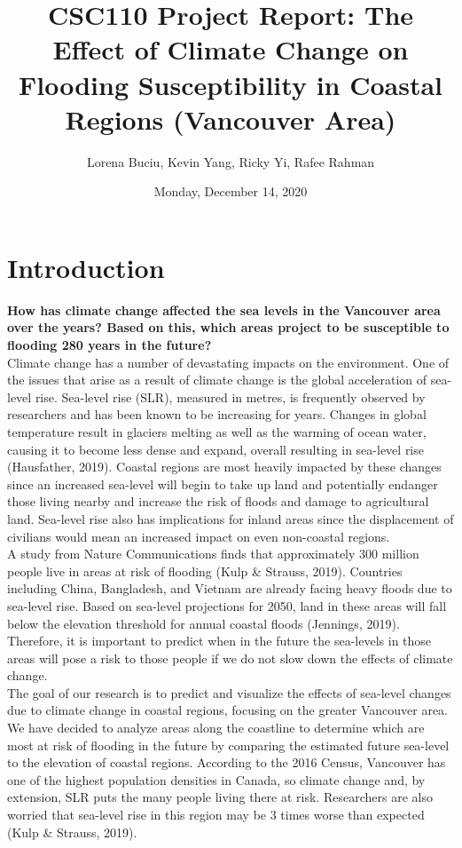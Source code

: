 \documentclass[fontsize=11pt]{article}
\title{CSC110 Project Report: The Effect of Climate Change on Flooding Susceptibility in Coastal Regions (Vancouver Area)}
\author{Lorena Buciu, Kevin Yang, Ricky Yi, Rafee Rahman}
\date{Monday, December 14, 2020}
\begin{document}
\maketitle

\section*{Introduction}

\textbf{How has climate change affected the sea levels in the Vancouver area over the years? Based on this, which areas project to be susceptible to flooding 280 years in the future?} \\

Climate change has a number of devastating impacts on the environment. One of the issues that arise as a result of climate change is the global acceleration of sea-level rise. Sea-level rise (SLR), measured in metres, is frequently observed by researchers and has been known to be increasing for years. Changes in global temperature result in glaciers melting as well as the warming of ocean water, causing it to become less dense and expand, overall resulting in sea-level rise (Hausfather, 2019). Coastal regions are most heavily impacted by these changes since an increased sea-level will begin to take up land and potentially endanger those living nearby and increase the risk of floods and damage to agricultural land. Sea-level rise also has implications for inland areas since the displacement of civilians would mean an increased impact on even non-coastal regions. \\
 
A study from Nature Communications finds that approximately 300 million people live in areas at risk of flooding (Kulp \& Strauss, 2019). Countries including China, Bangladesh, and Vietnam are already facing heavy floods due to sea-level rise. Based on sea-level projections for 2050, land in these areas will fall below the elevation threshold for annual coastal floods (Jennings, 2019). Therefore, it is important to predict when in the future the sea-levels in those areas will pose a risk to those people if we do not slow down the effects of climate change. \\

The goal of our research is to predict and visualize the effects of sea-level changes due to climate change in coastal regions, focusing on the greater Vancouver area. We have decided to analyze areas along the coastline to determine which are most at risk of flooding in the future by comparing the estimated future sea-level to the elevation of coastal regions. According to the 2016 Census, Vancouver has one of the highest population densities in Canada, so climate change and, by extension, SLR puts the many people living there at risk. Researchers are also worried that sea-level rise in this region may be 3 times worse than expected (Kulp \& Strauss, 2019). 
\end{document}
